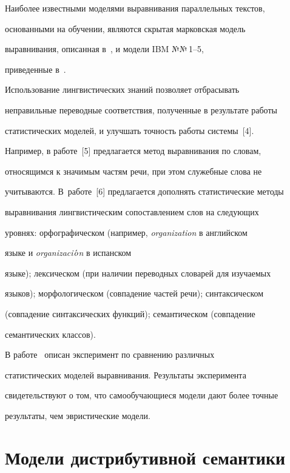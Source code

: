      Наиболее известными моделями выравнивания параллельных текстов,


основанными на обучении, являются скрытая марковская модель


выравнивания, описанная в~\cite{3-m}, и модели IBM №№\,1--5,


приведенные в~\cite{1-m}.





     Использование лингвистических знаний позволяет отбрасывать


неправильные переводные соответствия, полученные в результате работы


статистических моделей, и улучшать точность работы системы~[4].


Например, в работе~[5] предлагается метод выравнивания по словам,


относящимся к значимым частям речи, при этом служебные слова не


учитываются. В~работе~[6] предлагается дополнять статистические методы


выравнивания лингвистическим сопоставлением слов на следующих


уровнях: орфографическом (например, \textit{organization} в английском


языке и \textit{organizaci}$\acute{\mbox{\textit{o}}}$\textit{n} в испанском


языке); лексическом (при наличии переводных словарей для изучаемых


языков); морфологическом (совпадение частей речи); синтаксическом


(совпадение синтаксических функций); семантическом (совпадение


семантических классов).





     В работе~\cite{2-m} описан эксперимент по сравнению различных


статистических моделей выравнивания. Результаты эксперимента


свидетельствуют о том, что самообучающиеся модели дают более точные


результаты, чем эвристические модели.





\vspace*{-6pt}





\section{Модели дистрибутивной семантики}





